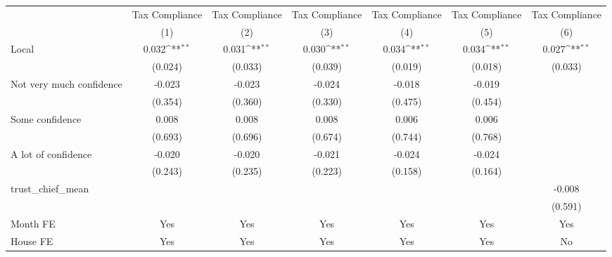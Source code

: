 {
\def\sym#1{\ifmmode^{#1}\else\(^{#1}\)\fi}
\begin{tabular}{l*{6}{c}}
\toprule
                &\multicolumn{1}{c}{Tax Compliance}&\multicolumn{1}{c}{Tax Compliance}&\multicolumn{1}{c}{Tax Compliance}&\multicolumn{1}{c}{Tax Compliance}&\multicolumn{1}{c}{Tax Compliance}&\multicolumn{1}{c}{Tax Compliance}\\
                &\multicolumn{1}{c}{(1)}         &\multicolumn{1}{c}{(2)}         &\multicolumn{1}{c}{(3)}         &\multicolumn{1}{c}{(4)}         &\multicolumn{1}{c}{(5)}         &\multicolumn{1}{c}{(6)}         \\
\midrule
Local           &    0.032\sym{**} &    0.031\sym{**} &    0.030\sym{**} &    0.034\sym{**} &    0.034\sym{**} &    0.027\sym{**} \\
                &  (0.024)         &  (0.033)         &  (0.039)         &  (0.019)         &  (0.018)         &  (0.033)         \\
Not very much confidence&   -0.023         &   -0.023         &   -0.024         &   -0.018         &   -0.019         &                  \\
                &  (0.354)         &  (0.360)         &  (0.330)         &  (0.475)         &  (0.454)         &                  \\
Some confidence &    0.008         &    0.008         &    0.008         &    0.006         &    0.006         &                  \\
                &  (0.693)         &  (0.696)         &  (0.674)         &  (0.744)         &  (0.768)         &                  \\
A lot of confidence&   -0.020         &   -0.020         &   -0.021         &   -0.024         &   -0.024         &                  \\
                &  (0.243)         &  (0.235)         &  (0.223)         &  (0.158)         &  (0.164)         &                  \\
trust\_chief\_mean&                  &                  &                  &                  &                  &   -0.008         \\
                &                  &                  &                  &                  &                  &  (0.591)         \\
Month FE        &      Yes         &      Yes         &      Yes         &      Yes         &      Yes         &      Yes         \\
House FE        &      Yes         &      Yes         &      Yes         &      Yes         &      Yes         &       No         \\

\end{tabular}}
